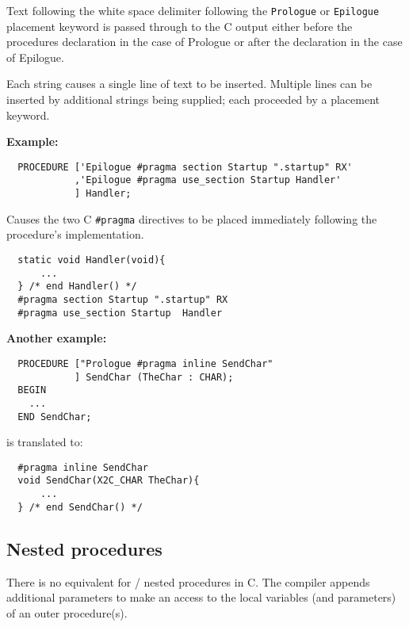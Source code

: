 Text following the white space delimiter following the {\tt Prologue} or
{\tt Epilogue} placement keyword is passed through to the C output either
before the procedures declaration in the case of Prologue or after
the declaration in the case of Epilogue.

Each string causes a single line of text to be inserted. Multiple
lines can be inserted by additional strings being supplied; each
proceeded by a placement keyword.

{\bf Example:}
\begin{verbatim}
  PROCEDURE ['Epilogue #pragma section Startup ".startup" RX'
            ,'Epilogue #pragma use_section Startup Handler'          
            ] Handler;
\end{verbatim}

Causes the two C {\tt \#pragma} directives to be placed immediately
following the procedure's implementation.

\begin{verbatim}
  static void Handler(void){
      ...
  } /* end Handler() */
  #pragma section Startup ".startup" RX
  #pragma use_section Startup  Handler
\end{verbatim}

{\bf Another example:}

\begin{verbatim}
  PROCEDURE ["Prologue #pragma inline SendChar"          
            ] SendChar (TheChar : CHAR);
  BEGIN
    ...
  END SendChar;
\end{verbatim}

is translated to: 

\begin{verbatim}
  #pragma inline SendChar 
  void SendChar(X2C_CHAR TheChar){
      ...
  } /* end SendChar() */
\end{verbatim}


\subsection{Nested procedures}\label{maptoc:proc:nested}

There is no equivalent for \mt{}/\ot{} nested procedures in C.  The
compiler appends additional parameters to make an access to the local
variables (and parameters) of an outer procedure(s).

